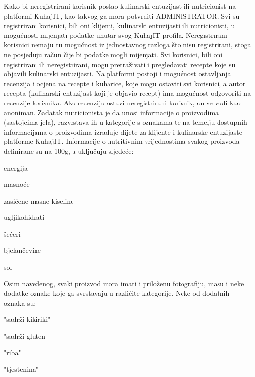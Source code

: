 		Kako bi neregistrirani korisnik postao kulinarski entuzijast ili nutricionist na platformi KuhajIT, kao takvog ga mora potvrditi ADMINISTRATOR.
				Svi su registrirani korisnici, bili oni klijenti, kulinarski entuzijasti ili nutricionisti, u mogućnosti mijenjati podatke unutar svog KuhajIT profila. Neregistrirani korisnici nemaju tu mogućnost iz jednostavnog razloga što nisu registrirani, stoga ne posjeduju račun čije bi podatke mogli mijenjati.
	Svi korisnici, bili oni registrirani ili neregistrirani, mogu pretraživati i pregledavati recepte koje su objavili kulinarski entuzijasti. Na platformi postoji i mogućnost ostavljanja recenzija i ocjena na recepte i kuharice, koje mogu ostaviti svi korisnici, a autor recepta (kulinarski entuzijast koji je objavio recept) ima mogućnost odgovoriti na recenzije korisnika. Ako recenziju ostavi neregistrirani korisnik, on se vodi kao anoniman.
	Zadatak nutricionista je da unosi informacije o proizvodima (sastojcima jela), razvrstava ih u kategorije s oznakama te na temelju dostupnih informacijama o proizvodima izrađuje dijete za klijente i kulinarske entuzijaste platforme KuhajIT.
	Informacije o nutritivnim vrijednostima svakog proizvoda definirane su na 100g, a uključuju sljedeće:
	\begin{packed_item}
		\item energija
		\item masnoće
		\item zasićene masne kiseline
		\item ugljikohidrati
		\item šećeri
		\item bjelančevine
		\item sol
	\end{packed_item}
	
	Osim navedenog, svaki proizvod mora imati i priloženu fotografiju, masu i neke dodatke oznake koje ga svrstavaju u različite kategorije. Neke od dodatnih oznaka su:
		\begin{packed_item}
			\item "sadrži kikiriki"
			\item "sadrži gluten
			\item "riba"
			\item "tjestenina"
		\end{packed_item}
	
